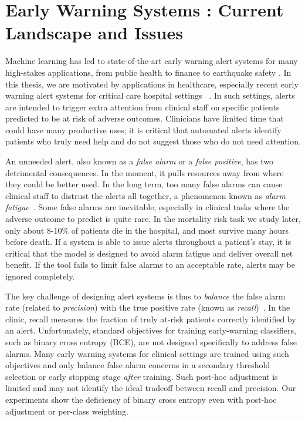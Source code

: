 \section{Early Warning Systems : Current Landscape and Issues}
Machine learning has led to state-of-the-art early warning alert systems for many high-stakes applications, from public health to finance to earthquake safety \citep{escobar2020automated, mousavi2019cred, al2020application}.
In this thesis, we are motivated by applications in healthcare, especially recent early warning alert systems for critical care hospital settings ~\citep{hylandEarlyPredictionCirculatory2020,sendakRealWorldIntegrationSepsis2020,wellnerPredictingUnplannedTransfers2017}.
In such settings, alerts are intended to trigger extra attention from clinical staff on specific patients predicted to be at risk of adverse outcomes.
Clinicians have limited time that could have many productive uses; it is critical that automated alerts identify patients who truly need help and do not suggest those who do not need attention.

An unneeded alert, also known as a \emph{false alarm} or a \emph{false positive}, has two detrimental consequences. In the moment, it pulls resources away from where they could be better used. In the long term, too many false alarms can cause clinical staff to distrust the alerts all together, a phenomenon known as \emph{alarm fatigue}~\citep{cvach2012monitor,deb2015alarm,sendelbach2013alarm}.
Some false alarms are inevitable, especially in clinical tasks where the adverse outcome to predict is quite rare.
In the mortality risk task we study later, only about 8-10\% of patients die in the hospital, and most survive many hours before death.
If a system is able to issue alerts throughout a patient's stay, it is critical that the model is designed to avoid alarm fatigue and deliver overall net benefit.
If the tool fails to limit false alarms to an acceptable rate, alerts may be ignored completely.

The key challenge of designing alert systems is thus to \emph{balance} the false alarm rate (related to \emph{precision}) with the true positive rate (known as \emph{recall})~\citep{romero-brufauWhyCstatisticNot2015}.
In the clinic, recall measures the fraction of truly at-risk patients correctly identified by an alert.
Unfortunately, standard objectives for training early-warning classifiers, such as binary cross entropy (BCE), are not designed specifically to address false alarms.
Many early warning systems for clinical settings \citep{hylandEarlyPredictionCirculatory2020,futomaLearningDetectSepsis2017} are trained using such objectives and only balance false alarm concerns in a secondary threshold selection or early stopping stage \emph{after} training.
Such post-hoc adjustment is limited and may not identify the ideal tradeoff between recall and precision.
Our experiments show the deficiency of binary cross entropy even with post-hoc adjustment or per-class weighting.

